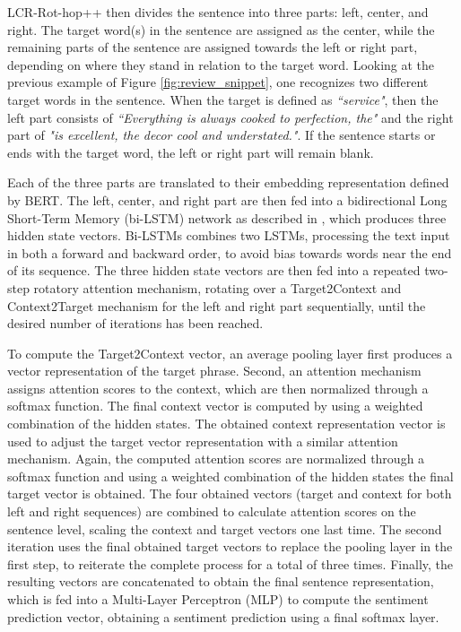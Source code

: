 LCR-Rot-hop++ then divides the sentence into three parts: left, center, and right. The target word(s) in the sentence are assigned as the center, while the remaining parts of the sentence are assigned towards the left or right part, depending on where they stand in relation to the target word. Looking at the previous example of Figure \ref{fig:review_snippet}, one recognizes two different target words in the sentence. When the target is defined as \textit{``service"}, then the left part consists of \textit{``Everything is always cooked to perfection, the"} and the right part of \textit{"is excellent, the decor cool and understated."}. If the sentence starts or ends with the target word, the left or right part will remain blank.

Each of the three parts are translated to their embedding representation defined by BERT. The left, center, and right part are then fed into a bidirectional Long Short-Term Memory (bi-LSTM) network as described in \cite{Cambria}, which produces three hidden state vectors. Bi-LSTMs combines two LSTMs, processing the text input in both a forward and backward order, to avoid bias towards words near the end of its sequence. The three hidden state vectors are then fed into a repeated two-step rotatory attention mechanism, rotating over a Target2Context and Context2Target mechanism for the left and right part sequentially, until the desired number of iterations has been reached.

To compute the Target2Context vector, an average pooling layer first produces a vector representation of the target phrase. Second, an attention mechanism assigns attention scores to the context, which are then normalized through a softmax function. The final context vector is computed by using a weighted combination of the hidden states.
The obtained context representation vector is used to adjust the target vector representation with a similar attention mechanism. Again, the computed attention scores are normalized through a softmax function and using a weighted combination of the hidden states the final target vector is obtained.
The four obtained vectors (target and context for both left and right sequences) are combined to calculate attention scores on the sentence level, scaling the context and target vectors one last time.
The second iteration uses the final obtained target vectors to replace the pooling layer in the first step, to reiterate the complete process for a total of three times.
Finally, the resulting vectors are concatenated to obtain the final sentence representation, which is fed into a Multi-Layer Perceptron (MLP) to compute the sentiment prediction vector, obtaining a sentiment prediction using a final softmax layer.


